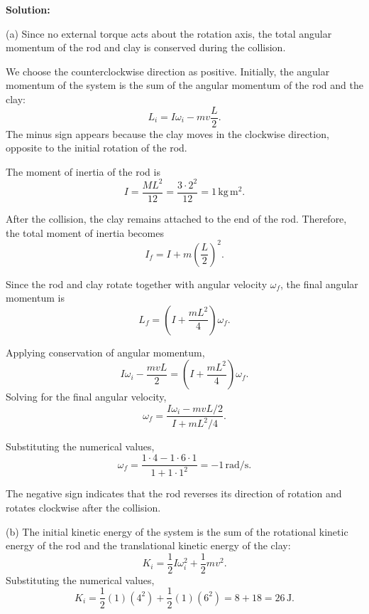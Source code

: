 \documentclass[12pt]{article}
\begin{document}
\textbf{Solution:}

(a) Since no external torque acts about the rotation
axis, the total angular momentum of the rod and clay
is conserved during the collision.

We choose the counterclockwise direction as positive.
Initially, the angular momentum of the system is the
sum of the angular momentum of the rod and the clay:
\begin{equation}
    L_i = I\omega_i - mv\frac{L}{2}.
\end{equation}
The minus sign appears because the clay moves in the
clockwise direction, opposite to the initial rotation
of the rod.

The moment of inertia of the rod is
\begin{equation}
    I = \frac{ML^2}{12}
    = \frac{3\cdot 2^2}{12}
    = 1\,\mathrm{kg\,m^2}.
\end{equation}

After the collision, the clay remains attached to the
end of the rod. Therefore, the total moment of inertia
becomes
\begin{equation}
    I_f = I + m\left(\frac{L}{2}\right)^2.
\end{equation}

Since the rod and clay rotate together with angular
velocity $\omega_f$, the final angular momentum is
\begin{equation}
    L_f =
    \left(I+\frac{mL^2}{4}\right)\omega_f.
\end{equation}

Applying conservation of angular momentum,
\begin{equation}
    I\omega_i - \frac{mvL}{2}
    = \left(I+\frac{mL^2}{4}\right)\omega_f.
\end{equation}
Solving for the final angular velocity,
\begin{equation}
    \omega_f =
    \frac{I\omega_i-mvL/2}
    {I+mL^2/4}.
\end{equation}

Substituting the numerical values,
\begin{equation}
    \omega_f =
    \frac{1\cdot 4-1\cdot 6\cdot 1}
    {1+1\cdot 1^2}
    = \boxed{-1\,\mathrm{rad/s}}.
\end{equation}

The negative sign indicates that the rod reverses
its direction of rotation and rotates clockwise
after the collision.


(b) The initial kinetic energy of the system is the
sum of the rotational kinetic energy of the rod
and the translational kinetic energy of the clay:
\begin{equation}
    K_i = \frac{1}{2}I\omega_i^2
    +\frac{1}{2}mv^2.
\end{equation}
Substituting the numerical values,
\begin{equation}
    K_i = \frac{1}{2}(1)(4^2)
    +\frac{1}{2}(1)(6^2)
    = 8+18=26\,\mathrm{J}.
\end{equation}
\end{document}
